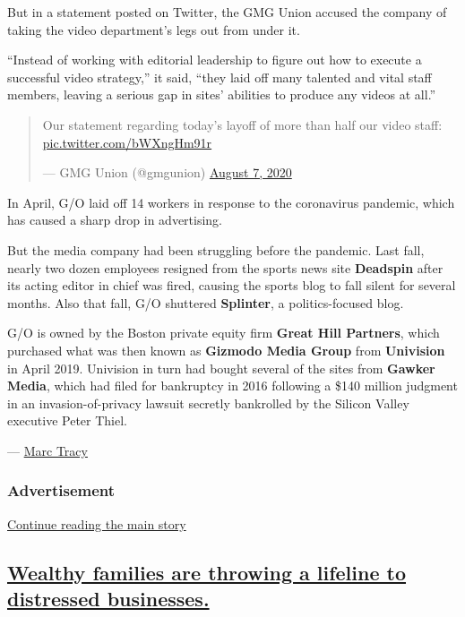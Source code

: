 But in a statement posted on Twitter, the GMG Union accused the company
of taking the video department's legs out from under it.

``Instead of working with editorial leadership to figure out how to
execute a successful video strategy,'' it said, ``they laid off many
talented and vital staff members, leaving a serious gap in sites'
abilities to produce any videos at all.''

\begin{quote}
Our statement regarding today's layoff of more than half our video
staff: \href{https://t.co/bWXngHm91r}{pic.twitter.com/bWXngHm91r}

--- GMG Union (@gmgunion)
\href{https://twitter.com/gmgunion/status/1291858333868097542?ref_src=twsrc\%5Etfw}{August
7, 2020}
\end{quote}

In April, G/O laid off 14 workers in response to the coronavirus
pandemic, which has caused a sharp drop in advertising.

But the media company had been struggling before the pandemic. Last
fall, nearly two dozen employees resigned from the sports news site
\textbf{Deadspin} after its acting editor in chief was fired, causing
the sports blog to fall silent for several months. Also that fall, G/O
shuttered \textbf{Splinter}, a politics-focused blog.

G/O is owned by the Boston private equity firm \textbf{Great Hill
Partners}, which purchased what was then known as \textbf{Gizmodo Media
Group} from \textbf{Univision} in April 2019. Univision in turn had
bought several of the sites from \textbf{Gawker Media}, which had filed
for bankruptcy in 2016 following a \$140 million judgment in an
invasion-of-privacy lawsuit secretly bankrolled by the Silicon Valley
executive Peter Thiel.

--- \href{https://www.nytimes3xbfgragh.onion/by/marc-tracy}{Marc Tracy}

\hypertarget{advertisement}{%
\subsubsection{Advertisement}\label{advertisement}}

\protect\hyperlink{after-dfp-ad-mid1}{Continue reading the main story}

\hypertarget{wealthy-families-are-throwing-a-lifeline-to-distressed-businesses}{%
\subsection{\texorpdfstring{\protect\hyperlink{wealthy-families-are-throwing-a-lifeline-to-distressed-businesses}{Wealthy
families are throwing a lifeline to distressed
businesses.}}{Wealthy families are throwing a lifeline to distressed businesses.}}\label{wealthy-families-are-throwing-a-lifeline-to-distressed-businesses}}

